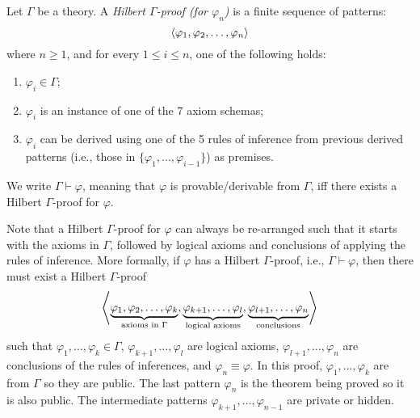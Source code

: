 \documentclass{article}
\begin{document}
\begin{definition}
\label{def:Hilbert-proof}
Let $\Gamma$ be a theory.
A \emph{Hilbert $\Gamma$-proof (for $\varphi_n$)} is a finite sequence of patterns:
\begin{equation}
\left\langle \varphi_1 , \varphi_2 , \dots , \varphi_n \right\rangle
\end{equation}
where $n \ge 1$, and for every $1 \le i \le n$, one of the following holds:
\begin{enumerate}
\item $\varphi_i \in \Gamma$;
\item $\varphi_i$ is an instance of one of the 7 axiom schemas;
\item $\varphi_i$ can be derived using one of the 5 rules of inference
      from previous derived patterns
      (i.e., those in $\{\varphi_1,\dots,\varphi_{i-1}\}$) as premises.
\end{enumerate}
We write $\Gamma \vdash \varphi$, meaning that $\varphi$ is provable/derivable from $\Gamma$,
iff there exists a Hilbert $\Gamma$-proof for $\varphi$.
\end{definition}

Note that a Hilbert $\Gamma$-proof for $\varphi$ can always be re-arranged
such that it starts with the axioms in $\Gamma$, followed by logical axioms
and conclusions of applying the rules of inference.
More formally, if $\varphi$ has a Hilbert $\Gamma$-proof, i.e., $\Gamma \vdash \varphi$, then there must exist
a Hilbert $\Gamma$-proof
\begin{equation}
\left\langle \underbrace{\varphi_1 , \varphi_2 , \dots, \varphi_k}_\text{axioms in $\Gamma$},
\underbrace{\varphi_{k+1},\dots,\varphi_{l}}_\text{logical axioms},
\underbrace{\varphi_{l+1}, \dots , \varphi_n}_\text{conclusions} \right\rangle
\end{equation}
such that $\varphi_1,\dots,\varphi_k \in \Gamma$,
$\varphi_{k+1},\dots,\varphi_l$ are logical axioms,
$\varphi_{l+1},\dots,\varphi_n$ are conclusions of the rules of inferences,
and $\varphi_n \equiv \varphi$.
In this proof, $\varphi_1,\dots,\varphi_k$ are from $\Gamma$ so they are public.
The last pattern $\varphi_n$ is the theorem being proved so it is also public.
The intermediate patterns $\varphi_{k+1},\dots,\varphi_{n-1}$
are private or hidden.
\end{document}
